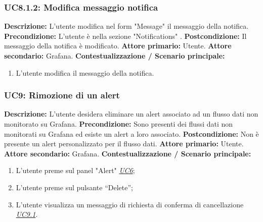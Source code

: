                 \subsubsection{UC8.1.2: Modifica messaggio notifica }
                    \textbf{Descrizione:} L’utente modifica nel form "Message" il messaggio della notifica.
                    \newline
                    \textbf{Precondizione:} L'utente è nella sezione "Notifications" .
                    \newline
                    \textbf{Postcondizione:} Il messaggio della notifica è modificato.
                    \newline
                    \textbf{Attore primario:} Utente.
                    \newline
                    \textbf{Attore secondario:} Grafana.
                    \newline
                    \textbf{Contestualizzazione / Scenario principale:} \begin{enumerate}
                            \item L'utente modifica il messaggio della notifica.
                        \end{enumerate} 		
                		
                		
                		
                    
                \subsubsection{UC9: Rimozione di un alert}
                    \textbf{Descrizione:}  L’utente desidera eliminare un alert associato ad un flusso dati non monitorato su Grafana.
                    \newline
                    \textbf{Precondizione:} Sono presenti dei flussi dati non monitorati su Grafana ed esiste un alert a loro associato.
                    \newline
                    \textbf{Postcondizione:} Non è presente un alert personalizzato per il flusso dati.
                    \newline
                    \textbf{Attore primario:} Utente.
                    \newline
                    \textbf{Attore secondario:} Grafana.
                    \newline
                    \textbf{Contestualizzazione / Scenario principale:} \begin{enumerate}
                            \item L'utente preme sul panel "Alert" \underline{\textit{UC6}};
                            \item L’utente preme sul pulsante “Delete”;
                            \item L’utente visualizza un messaggio di richiesta di conferma di cancellazione \underline{\textit{UC9.1}}.
                        \end{enumerate}
                    
